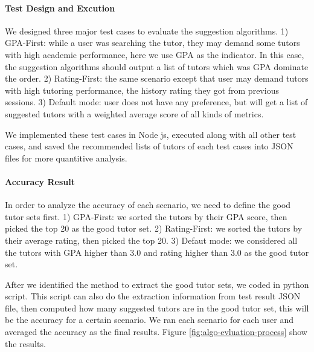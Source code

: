 \paragraph{Test Design and Excution} 
We designed three major test cases to evaluate the suggestion algorithms. 1) GPA-First: while a user was searching the tutor, they may demand some tutors with high academic performance, here we use GPA as the indicator. In this case, the suggestion algorithms should output a list of tutors which was GPA dominate the order. 2) Rating-First: the same scenario except that user may demand tutors with high tutoring performance, the history rating they got from previous sessions. 3) Default mode: user does not have any preference, but will get a list of suggested tutors with a weighted average score of all kinds of metrics.

We implemented these test cases in Node js, executed along with all other test cases, and saved the recommended lists of tutors of each test cases into JSON files for more quantitive analysis.

\paragraph{Accuracy Result} 
In order to analyze the accuracy of each scenario, we need to define the good tutor sets first. 1) GPA-First: we sorted the tutors by their GPA score, then picked the top 20 as the good tutor set. 2) Rating-First: we sorted the tutors by their average rating, then picked the top 20. 3) Defaut mode: we considered all the tutors with GPA higher than 3.0 and rating higher than 3.0 as the good tutor set.

After we identified the method to extract the good tutor sets, we coded in python script. This script can also do the extraction information from test result JSON file, then computed how many suggested tutors are in the good tutor set, this will be the accuracy for a certain scenario. We ran each scenario for each user and averaged the accuracy as the final results. Figure \ref{fig:algo-evluation-process} show the results.

